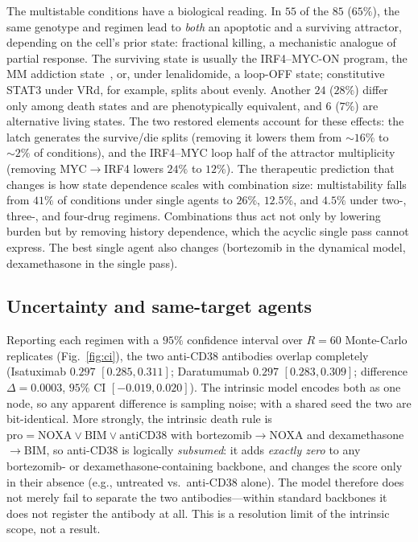 \documentclass[conference,letterpaper]{IEEEtran}
\begin{document}
The multistable conditions have a biological reading. In $55$ of the $85$
($65\%$), the same genotype and regimen lead to \emph{both} an apoptotic and a
surviving attractor, depending on the cell's prior state: fractional killing, a
mechanistic analogue of partial response. The surviving state is usually the
IRF4--MYC-ON program, the MM addiction state~\cite{shaffer}, or, under
lenalidomide, a loop-OFF state; constitutive STAT3 under VRd, for example, splits
about evenly. Another $24$ ($28\%$) differ only among death states and are
phenotypically equivalent, and $6$ ($7\%$) are alternative living states. The two
restored elements account for these effects: the latch generates the survive/die
splits (removing it lowers them from ${\sim}16\%$ to ${\sim}2\%$ of conditions),
and the IRF4--MYC loop half of the attractor multiplicity (removing MYC$\to$IRF4
lowers $24\%$ to $12\%$). The therapeutic prediction that changes is how state
dependence scales with combination size: multistability falls from $41\%$ of
conditions under single agents to $26\%$, $12.5\%$, and $4.5\%$ under two-,
three-, and four-drug regimens. Combinations thus act not only by lowering burden
but by removing history dependence, which the acyclic single pass cannot express.
The best single agent also changes (bortezomib in the dynamical model,
dexamethasone in the single pass).



\subsection{Uncertainty and same-target agents}\label{sec:res-ci}
Reporting each regimen with a $95\%$ confidence interval over $R=60$
Monte-Carlo replicates (Fig.~\ref{fig:ci}), the two anti-CD38 antibodies
overlap completely (Isatuximab $0.297$ $[0.285,0.311]$; Daratumumab $0.297$
$[0.283,0.309]$; difference $\Delta=0.0003$, $95\%$ CI $[-0.019,0.020]$). The
intrinsic model encodes both as one node, so any apparent difference is
sampling noise; with a shared seed the two are bit-identical. More strongly, the
intrinsic death rule is $\text{pro}=\text{NOXA}\vee\text{BIM}\vee\text{antiCD38}$
with bortezomib$\to$NOXA and dexamethasone$\to$BIM, so anti-CD38 is logically
\emph{subsumed}: it adds \emph{exactly zero} to any bortezomib- or
dexamethasone-containing backbone, and changes the score only in their absence
(e.g., untreated vs.\ anti-CD38 alone). The model therefore does not merely fail
to separate the two antibodies---within standard backbones it does not register
the antibody at all. This is a resolution limit of the intrinsic scope, not a
result.
\end{document}
